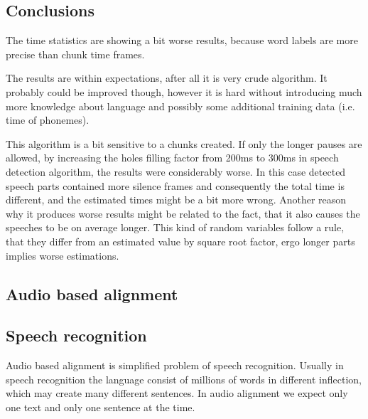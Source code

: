 \documentclass[12pt,a4paper,english]{article}
\begin{document}
\newpage
\subsection{Conclusions}

The time statistics are showing a bit worse results, because word labels are more precise than chunk time frames. \newline

The results are within expectations, after all it is very crude algorithm. It probably could be improved though, however it is hard without introducing much more knowledge about language and possibly some additional training data (i.e. time of phonemes). \newline

This algorithm is a bit sensitive to a chunks created. If only the longer pauses are allowed, by increasing the holes filling factor from 200ms to 300ms in  speech detection algorithm, the results were considerably worse. \newline
In this case detected speech parts contained more silence frames and consequently the total time is different, and the estimated times might be a bit more wrong. Another reason why it produces worse results might be related to the fact, that it also causes the speeches to be on average longer. This kind of random variables follow a rule, that they differ from an estimated value by square root factor, ergo longer parts implies worse estimations.

\newpage
\begin{center}
    \section{Audio based alignment}
\end {center}
\subsection{Speech recognition}

Audio based alignment is simplified problem of speech recognition. Usually in speech recognition the language consist of millions of words in different inflection, which may create many different sentences. In audio alignment we expect only one text and only one sentence at the time. \newline
\end{document}
